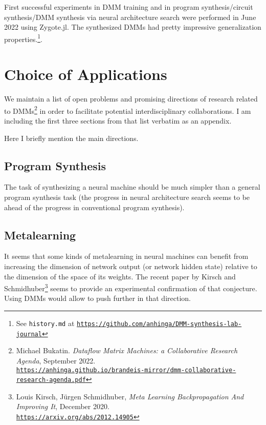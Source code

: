 \documentclass{article}
\begin{document}
First successful experiments in DMM training and in program synthesis/circuit synthesis/DMM synthesis via neural architecture search
were performed in June 2022 using Zygote.jl. The synthesized DMMs had pretty impressive generalization properties.\footnote{See {\tt history.md} at
\href{https://github.com/anhinga/DMM-synthesis-lab-journal}{\tt https://github.com/anhinga/DMM-synthesis-lab-journal}}.

\section{Choice of Applications}

We maintain a list of open problems and promising directions of research related to 
DMMs\footnote{Michael Bukatin. {\em Dataflow Matrix Machines:  a Collaborative Research Agenda}, September 2022.\\
\href{https://anhinga.github.io/brandeis-mirror/dmm-collaborative-research-agenda.pdf}
{\tt https://anhinga.github.io/brandeis-mirror/dmm-collaborative-research-agenda.pdf}} in order to facilitate potential
interdisciplinary collaborations. I am including the first three
sections from that list verbatim as an appendix. 

Here I briefly mention the main directions.

\subsection{Program Synthesis}

The task of synthesizing a neural machine should be much simpler than a general program synthesis task
(the progress in neural architecture search seems to be ahead of the progress in conventional program synthesis).

\subsection{Metalearning}

It seems that some kinds of metalearning in neural machines can benefit from increasing the dimension of
network output (or network hidden state) relative to the dimension of the space of its weights. The recent
paper by Kirsch and Schmidhuber\footnote{Louis Kirsch, Jürgen Schmidhuber,
{\em Meta Learning Backpropagation And Improving It}, December 2020.\\
\href{https://arxiv.org/abs/2012.14905}{\tt https://arxiv.org/abs/2012.14905}} seems to provide
an experimental confirmation of that conjecture. Using DMMs would allow to push further in that direction. 
\end{document}
